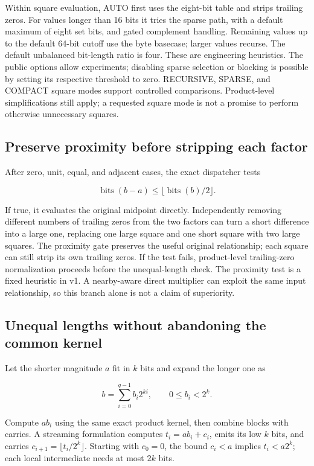 \documentclass[11pt,a4paper]{article}
\begin{document}
Within square evaluation, AUTO first uses the eight-bit table and strips trailing zeros. For values longer than 16 bits it tries the sparse path, with a default maximum of eight set bits, and gated complement handling. Remaining values up to the default 64-bit cutoff use the byte basecase; larger values recurse. The default unbalanced bit-length ratio is four. These are engineering heuristics. The public options allow experiments; disabling sparse selection or blocking is possible by setting its respective threshold to zero. RECURSIVE, SPARSE, and COMPACT square modes support controlled comparisons. Product-level simplifications still apply; a requested square mode is not a promise to perform otherwise unnecessary squares.

\subsection{Preserve proximity before stripping each factor}

After zero, unit, equal, and adjacent cases, the exact dispatcher tests

\[
\operatorname{bits}(b-a)\le\lfloor\operatorname{bits}(b)/2\rfloor.
\]

If true, it evaluates the original midpoint directly. Independently removing different numbers of trailing zeros from the two factors can turn a short difference into a large one, replacing one large square and one short square with two large squares. The proximity gate preserves the useful original relationship; each square can still strip its own trailing zeros. If the test fails, product-level trailing-zero normalization proceeds before the unequal-length check. The proximity test is a fixed heuristic in v1. A nearby-aware direct multiplier can exploit the same input relationship, so this branch alone is not a claim of superiority.

\subsection{Unequal lengths without abandoning the common kernel}

Let the shorter magnitude $a$ fit in $k$ bits and expand the longer one as

\[
b=\sum_{i=0}^{q-1}b_i2^{ki},\qquad 0\le b_i<2^k.
\]

Compute $ab_i$ using the same exact product kernel, then combine blocks with carries. A streaming formulation computes $t_i=ab_i+c_i$, emits its low $k$ bits, and carries $c_{i+1}=\lfloor t_i/2^k\rfloor$. Starting with $c_0=0$, the bound $c_i<a$ implies $t_i<a2^k$; each local intermediate needs at most $2k$ bits.
\end{document}
